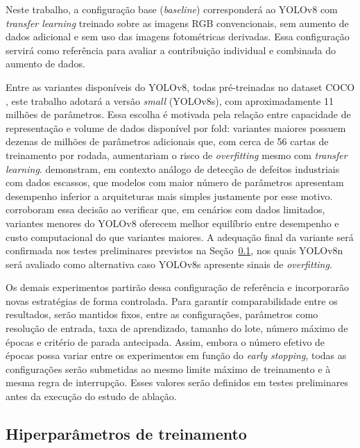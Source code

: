 \documentclass[
    12pt,                %
    openright,           %
    oneside,             %
    a4paper,             %
    english,             %
    brazil               %
]{abntex2}
\begin{document}
Neste trabalho, a configuração base (\textit{baseline}) corresponderá ao
YOLOv8 com \textit{transfer learning} treinado sobre as imagens RGB
convencionais, sem aumento de dados adicional e sem uso das imagens
fotométricas derivadas. Essa configuração servirá como referência para avaliar
a contribuição individual e combinada do aumento de dados.

Entre as variantes disponíveis do YOLOv8, todas pré-treinadas no 
dataset COCO \cite{Lin2014}, este trabalho adotará a versão 
\textit{small} (YOLOv8s), com aproximadamente 11 milhões de 
parâmetros. Essa escolha é motivada pela relação entre capacidade de 
representação e volume de dados disponível por fold: variantes maiores 
possuem dezenas de milhões de parâmetros adicionais que, com cerca de 
56 cartas de treinamento por rodada, aumentariam o risco de 
\textit{overfitting} mesmo com \textit{transfer learning}. 
 demonstram, em contexto análogo de detecção de 
defeitos industriais com dados escassos, que modelos com maior número 
de parâmetros apresentam desempenho inferior a arquiteturas mais 
simples justamente por esse motivo.  
corroboram essa decisão ao verificar que, em cenários com dados 
limitados, variantes menores do YOLOv8 oferecem melhor equilíbrio 
entre desempenho e custo computacional do que variantes maiores. 
A adequação final da variante será confirmada nos testes preliminares 
previstos na Seção~\ref{subsec:hiperparametros}, nos quais YOLOv8n 
será avaliado como alternativa caso YOLOv8s apresente sinais de 
\textit{overfitting}.

Os demais experimentos partirão dessa configuração de referência e incorporarão
novas estratégias de forma controlada. Para garantir comparabilidade entre os
resultados, serão mantidos fixos, entre as configurações, parâmetros como
resolução de entrada, taxa de aprendizado, tamanho do lote, número máximo de
épocas e critério de parada antecipada. Assim, embora o número efetivo de épocas
possa variar entre os experimentos em função do \textit{early stopping}, todas
as configurações serão submetidas ao mesmo limite máximo de treinamento e à
mesma regra de interrupção. Esses valores serão definidos em testes preliminares
antes da execução do estudo de ablação.

\subsection{Hiperparâmetros de treinamento}
\label{subsec:hiperparametros}
\end{document}
